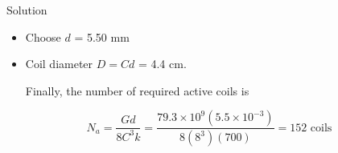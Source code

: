 \documentclass[10pt, svgnames]{beamer}
\begin{document}
\begin{frame}[label={sec:orgcc11ffd}]{Solution}
\begin{itemize}
\item Choose \(d\) = 5.50 mm
\item Coil diameter \(D = Cd\) = 4.4 cm.

Finally, the number of required active coils is
\end{itemize}

\[N_a = \frac{Gd}{8C^3k} = \frac{79.3 \times 10^9(5.5 \times 10^{ - 3})}{8(8^3)(700)} = 152\text{ coils}\]
\end{frame}
\end{document}
